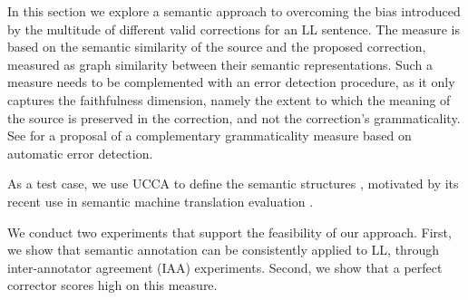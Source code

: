 \documentclass[letter,11pt]{article}
\begin{document}

In this section we explore a semantic approach to overcoming the bias
introduced by the multitude of different valid corrections for an LL sentence.
The measure is based on the semantic similarity of the source and the proposed correction,
measured as graph similarity between their semantic representations.
Such a measure needs to be complemented with an
error detection procedure, as it only captures
the faithfulness dimension, namely the extent to which
the meaning of the source is preserved in the correction,
and not the correction's grammaticality.
See \cite{napoles-sakaguchi-tetreault:2016:EMNLP2016}
for a proposal of a complementary grammaticality measure based
on automatic error detection.

As a test case, we use UCCA to define the semantic structures \cite{abend2013universal}, motivated by
its recent use in semantic machine translation evaluation \cite{birch2016hume}.

We conduct two experiments that support the feasibility of our approach.
First, we show that semantic annotation can be consistently applied to LL,
through inter-annotator agreement (IAA) experiments.
Second, we show that a perfect corrector scores high on this measure.


\end{document}
